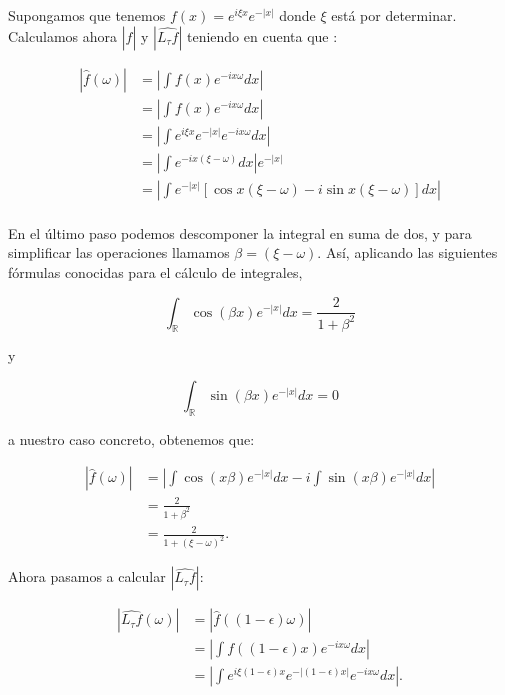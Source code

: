   \medskip

  \noindent Supongamos que tenemos $f(x)=e^{i \xi x}e^{-|x|}$ donde $\xi$ está por determinar. Calculamos ahora $|\widehat{f}|$ y $|\widehat{L_\tau f}|$ teniendo en cuenta que :


  \begin{align*}
    |\widehat{f}(\omega)|&=\left|  \int{f(x)e^{-ix\omega}dx}  \right | \\
    &=\left|  \int{f(x)e^{-ix\omega}dx}  \right | \\
    &=\left|  \int{e^{i \xi x}e^{-|x|}e^{-ix\omega}dx}  \right | \\
    &=\left|  \int{e^{-ix(\xi-\omega)}dx} \right |e^{-|x|} \\
    &=\left|  \int{e^{-|x|}\left[\cos{x(\xi-\omega)} -i\sin{x(\xi-\omega)}\right]dx} \right| \\
  \end{align*}

  \noindent En el último paso podemos descomponer la integral en suma de dos, y para simplificar las operaciones llamamos $\beta=(\xi - \omega)$. Así, aplicando las siguientes fórmulas conocidas para el cálculo de integrales,


  \begin{equation} \label{eq:res_auxiliar_1}
    \int_\mathbb{R} \cos(\beta x) e^{-|x|} dx= \frac{2}{1+\beta^2}
  \end{equation}

  \noindent y 

  \begin{equation}\label{eq:res_auxiliar_2}
    \int_\mathbb{R} \sin(\beta x) e^{-|x|} dx= 0
  \end{equation}

  \noindent a nuestro caso concreto, obtenemos que: 

  \begin{align*}
    |\widehat{f}(\omega)|&=\left|  \int{\cos(x\beta)e^{-|x|} dx} - i \int{\sin(x\beta)e^{-|x|} dx} \right| \\
    &=\frac{2}{1+\beta^2} \\
    &=\frac{2}{1+(\xi - \omega)^2}.
  \end{align*} 

  \noindent Ahora pasamos a calcular $|\widehat{L_\tau f}|$:

  \begin{align*}
    |\widehat{L_\tau f}(\omega)| &= |\widehat{f}((1-\epsilon)\omega)| \\
    &=\left|  \int{f((1-\epsilon)x)e^{-ix\omega}dx}  \right | \\
    &=\left|  \int{e^{i \xi (1-\epsilon) x}e^{-|(1-\epsilon)x|}e^{-ix\omega}dx}  \right |. \\
  \end{align*}

